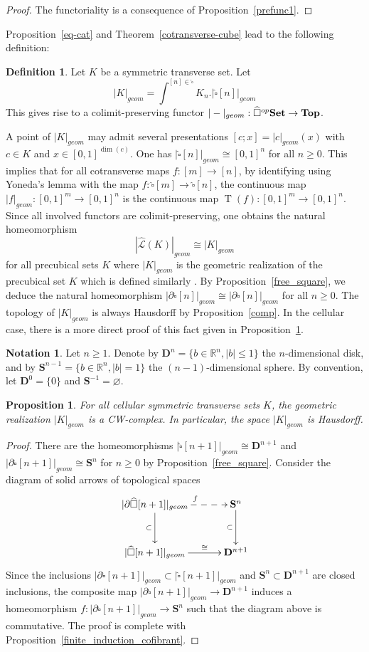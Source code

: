 \documentclass[a4paper,12pt]{amsart}
\makeatletter
\newcommand{\de}{\partial}
\newtheorem{prop}[thm]{Proposition}
\newcommand{\bp}{\begin{prop}}
\newcommand{\ep}{\end{prop}}
\newcommand{\bpf}{\begin{proof}}
\newcommand{\epf}{\end{proof}}
\theoremstyle{definition}
\newtheorem{defn}[thm]{Definition}
\newcommand{\bd}{\begin{defn}}
\newcommand{\ed}{\end{defn}}
\newtheorem{nota}[thm]{Notation}
\newcommand{\fr}[1]{\ar@{->}[r]^-{#1}}
\newcommand{\fd}[1]{\ar@{->}[d]_-{#1}}
\renewcommand{\top}{{\mathbf{Top}}}
\newcommand{\iso}{\cong}
\renewcommand{\leq}{\leqslant}
\renewcommand{\geq}{\geqslant}
\newcommand{\brm}[1]{{\rm{\mathbf{#1}}}}
\newcommand{\set}{{\brm{Set}}}
\newcommand{\Di}{\mathbf{D}}
\newcommand{\Sp}{\mathbf{S}}
\DeclareMathOperator{\TT}{T}
\makeatother
\begin{document}
\bpf
The functoriality is a consequence of Proposition~\ref{prefunc1}.
\epf

Proposition~\ref{eq-cat} and Theorem~\ref{cotransverse-cube} lead to the following definition:

\bd
Let $K$ be a symmetric transverse set. Let 
\[
|K|_{geom} = \int^{[n]\in \widehat{\square}} K_n.|\widehat{\square}[n]|_{geom}
\]
This gives rise to a colimit-preserving functor $|-|_{geom}:\widehat{\square}^{op}\set \to \top$. 
\ed

A point of $|K|_{geom}$ may admit several presentations $[c;x]=|c|_{geom}(x)$ with $c\in K$ and $x\in [0,1]^{\dim (c)}$. One has $|\widehat{\square}[n]|_{geom} \iso [0,1]^n$ for all $n\geq 0$. This implies that for all cotransverse maps $f:[m]\to [n]$, by identifying using Yoneda's lemma with the map $f:\widehat{\square}[m]\to \widehat{\square}[n]$, the continuous map $|f|_{geom}:[0,1]^m\to [0,1]^n$ is the continuous map $\TT(f):[0,1]^m\to [0,1]^n$. Since all involved functors are colimit-preserving, one obtains the natural homeomorphism \[|\widehat{\mathcal{L}}(K)|_{geom}\iso |K|_{geom}\] for all precubical sets $K$ where $|K|_{geom}$ is the geometric realization of the precubical set $K$ which is defined similarly \cite[Notation~4.1]{NaturalRealization}. By Proposition~\ref{free_square}, we deduce the natural homeomorphism $|\de\widehat{\square}[n]|_{geom} \iso |\de\square[n]|_{geom}$ for all $n\geq 0$. The topology of $|K|_{geom}$ is always Hausdorff by Proposition~\ref{comp}. In the cellular case, there is a more direct proof of this fact given in Proposition~\ref{CW-complex}.

\begin{nota}
	Let $n\geq 1$. Denote by $\mathbf{D}^n = \{b\in \mathbb{R}^n, |b| \leq 1\}$ the $n$-dimensional disk, and by $\mathbf{S}^{n-1} = \{b\in \mathbb{R}^n, |b| = 1\}$ the $(n-1)$-dimensional sphere. By convention, let $\mathbf{D}^{0}=\{0\}$ and $\mathbf{S}^{-1}=\varnothing$.
\end{nota}

\bp \label{CW-complex}
	For all cellular symmetric transverse sets $K$, the geometric realization $|K|_{geom}$ is a CW-complex. In particular, the space $|K|_{geom}$ is Hausdorff.
\ep

\bpf
There are the homeomorphisms $|\widehat{\square}[n+1]|_{geom} \iso \Di^{n+1}$ and $|\de\widehat{\square}[n+1]|_{geom} \iso \Sp^n$ for $n\geq 0$ by Proposition~\ref{free_square}. Consider the diagram of solid arrows of topological spaces 
\[
\xymatrix@C=3em@R=3em
{
	|\de\widehat{\square}[n+1]|_{geom} \fd{\subset}\ar@{-->}[r]^{f} & \Sp^n \fd{\subset}\\
	|\widehat{\square}[n+1]|_{geom} \fr{\iso} & \Di^{n+1}
}
\]
Since the inclusions $|\de\widehat{\square}[n+1]|_{geom}\subset |\widehat{\square}[n+1]|_{geom}$ and $\Sp^n\subset \Di^{n+1}$ are closed inclusions, the composite map $|\de\widehat{\square}[n+1]|_{geom}\to \Di^{n+1}$ induces a homeomorphism $f:|\de\widehat{\square}[n+1]|_{geom}\to \Sp^n$ such that the diagram above is commutative. The proof is complete with Proposition~\ref{finite_induction_cofibrant}.
\epf
\end{document}
